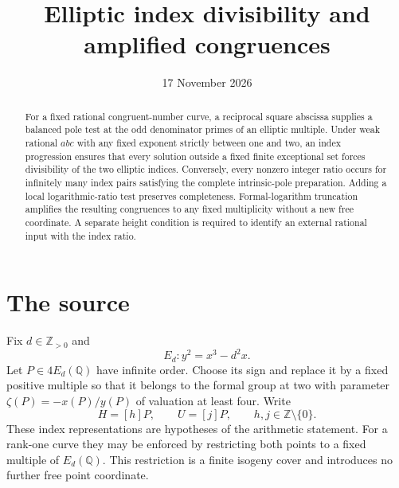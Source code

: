 \documentclass[11pt,a4paper]{article}
\title{Elliptic index divisibility and amplified congruences}
\author{}\date{17 November 2026}
\newcommand{\Q}{\mathbb Q}\newcommand{\Z}{\mathbb Z}
\begin{document}
\maketitle

\begin{abstract}
For a fixed rational congruent-number curve, a reciprocal square
abscissa supplies a balanced pole test at the odd denominator primes
of an elliptic multiple. Under weak rational $abc$ with any fixed
exponent strictly between one and two, an index progression ensures
that every solution outside a fixed finite exceptional set forces
divisibility of the two elliptic indices. Conversely, every nonzero
integer ratio occurs for infinitely many index pairs satisfying the
complete intrinsic-pole preparation. Adding a local logarithmic-ratio
test preserves completeness. Formal-logarithm truncation amplifies
the resulting congruences to any fixed multiplicity without a new free
coordinate. A separate height condition is required to identify an
external rational input with the index ratio.
\end{abstract}

\section{The source}\label{sec:source}

Fix $d\in\Z_{>0}$ and
\[
                         E_d:y^2=x^3-d^2x.
\]
Let $P\in4E_d(\Q)$ have infinite order. Choose its sign and replace
it by a fixed positive multiple so that it belongs to the formal group at two with
parameter $\zeta(P)=-x(P)/y(P)$ of valuation at least four.
Write
\[
              H=[h]P,\qquad U=[j]P,\qquad h,j\in\Z\setminus\{0\}.
\]
These index representations are hypotheses of the arithmetic statement.
For a rank-one curve they may be enforced by restricting both points
to a fixed multiple of $E_d(\Q)$. This restriction is a finite
isogeny cover and introduces no further free point coordinate.
\end{document}
